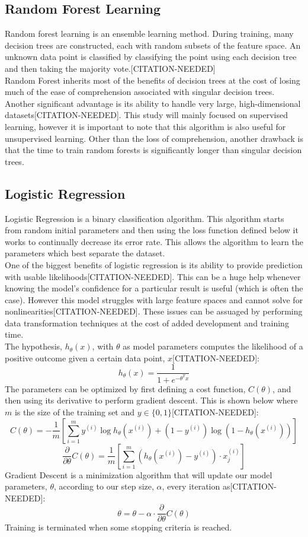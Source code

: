 \documentclass[titlepage]{article}
\begin{document}
\subsection{Random Forest Learning}
Random forest learning is an ensemble learning method. During training, many decision trees are constructed, each with random subsets of the feature space. An unknown data point is classified by classifying the point using each decision tree and then taking the majority vote.[CITATION-NEEDED]\\
Random Forest inherits most of the benefits of decision trees at the cost of losing much of the ease of comprehension associated with singular decision trees. Another significant advantage is its ability to handle very large, high-dimensional datasets[CITATION-NEEDED]. This study will mainly focused on supervised learning, however it is important to note that this algorithm is also useful for unsupervised learning. Other than the loss of comprehension, another drawback is that the time to train random forests is significantly longer than singular decision trees.

\subsection{Logistic Regression}
Logistic Regression is a binary classification algorithm. This algorithm starts from random initial parameters and then using the loss function defined below it works to continually decrease its error rate. This allows the algorithm to learn the parameters which best separate the dataset.\\
One of the biggest benefits of logistic regression is its ability to provide prediction with usable likelihoods[CITATION-NEEDED]. This can be a huge help whenever knowing the model's confidence for a particular result is useful (which is often the case). However this model struggles with large feature spaces and cannot solve for nonlinearities[CITATION-NEEDED]. These issues can be assuaged by performing data transformation techniques at the cost of added development and training time.\\
The hypothesis, $h_\theta(x)$, with $\theta$ as model parameters computes the likelihood of a positive outcome given a certain data point, $x$[CITATION-NEEDED]:
$$h_\theta(x) = \frac{1}{1 + e^{-\theta^T x}}$$
The parameters can be optimized by first defining a cost function, $C(\theta)$, and then using its derivative to perform gradient descent. This is shown below where $m$ is the size of the training set and $y \in \{0, 1\}$[CITATION-NEEDED]:
$$C(\theta) = -\frac{1}{m}\left[\sum\limits_{i=1}^m y^{(i)} \log h_\theta(x^{(i)}) + (1-y^{(i)})\log(1-h_\theta(x^{(i)}))\right]$$
$$\frac{\partial}{\partial\theta}C(\theta) = \frac{1}{m}\left[\sum\limits_{i=1}^m (h_\theta(x^{(i)}) - y^{(i)})\cdot x_j^{(i)}\right]$$
Gradient Descent is a minimization algorithm that will update our model parameters, $\theta$, according to our step size, $\alpha$, every iteration as[CITATION-NEEDED]:
$$\theta = \theta-\alpha\cdot\frac{\partial}{\partial\theta}C(\theta)$$
Training is terminated when some stopping criteria is reached.
\end{document}
